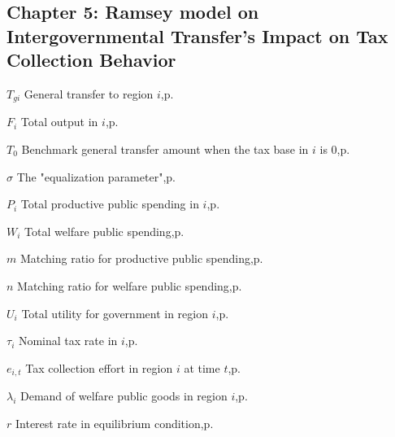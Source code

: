 \begin{eqlist}
    \section*{Chapter 5: Ramsey model on Intergovernmental Transfer's Impact on Tax Collection Behavior}
    \item[$T_{gi}$]
    General transfer to region $i$,\hfill p.~\pageref{gttt}

    \item[$F_i$]
    Total output in $i$,\hfill p.~\pageref{gttt}

    \item[$T_0$]
    Benchmark general transfer amount when the tax base in $i$ is 0,\hfill p.~\pageref{gttt}

    \item[$\sigma$]
    The "equalization parameter",\hfill p.~\pageref{gttt}

    \item[$P_i$]
    Total productive public spending in $i$,\hfill p.~\pageref{pandwww}

    \item[$W_i$]
    Total welfare public spending,\hfill p.~\pageref{pandwww}

    \item[$m$]
    Matching ratio for productive public spending,\hfill p.~\pageref{matchcc}

    \item[$n$]
    Matching ratio for welfare public spending,\hfill p.~\pageref{matchcc}

    \item[$U_i$]
    Total utility for government in region $i$,\hfill p.~\pageref{U}

    \item[$\tau_i$]
    Nominal tax rate in $i$,\hfill p.~\pageref{taxrateee}

    \item[$e_{i,t}$]
    Tax collection effort in region $i$ at time $t$,\hfill p.~\pageref{taxrateee}

    \item[$\lambda_i$]
    Demand of welfare public goods in region $i$,\hfill p.~\pageref{demanddd}

    \item[$r$]
    Interest rate in equilibrium condition,\hfill p.~\pageref{R}
\end{eqlist}